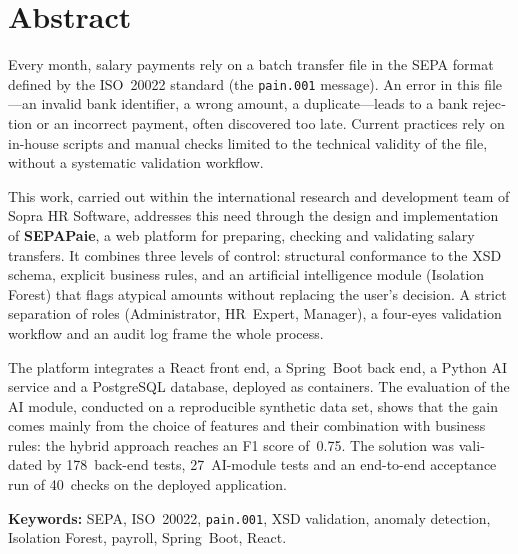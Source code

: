 \chapter*{Abstract}

\begin{otherlanguage}{english}
Every month, salary payments rely on a batch transfer file in the SEPA format defined by the ISO~20022 standard (the \texttt{pain.001} message). An error in this file---an invalid bank identifier, a wrong amount, a duplicate---leads to a bank rejection or an incorrect payment, often discovered too late. Current practices rely on in-house scripts and manual checks limited to the technical validity of the file, without a systematic validation workflow.

This work, carried out within the international research and development team of Sopra HR Software, addresses this need through the design and implementation of \textbf{SEPAPaie}, a web platform for preparing, checking and validating salary transfers. It combines three levels of control: structural conformance to the XSD schema, explicit business rules, and an artificial intelligence module (Isolation Forest) that flags atypical amounts without replacing the user's decision. A strict separation of roles (Administrator, HR~Expert, Manager), a four-eyes validation workflow and an audit log frame the whole process.

The platform integrates a React front end, a Spring~Boot back end, a Python AI service and a PostgreSQL database, deployed as containers. The evaluation of the AI module, conducted on a reproducible synthetic data set, shows that the gain comes mainly from the choice of features and their combination with business rules: the hybrid approach reaches an F1 score of~0.75. The solution was validated by 178~back-end tests, 27~AI-module tests and an end-to-end acceptance run of 40~checks on the deployed application.

\vspace{0.4cm}
\noindent\textbf{Keywords:} SEPA, ISO~20022, \texttt{pain.001}, XSD validation, anomaly detection, Isolation Forest, payroll, Spring~Boot, React.
\end{otherlanguage}

\clearpage
